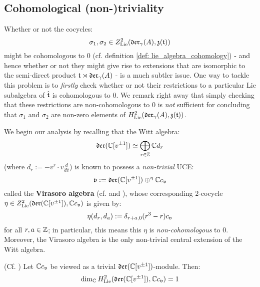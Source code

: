     \subsection{Cohomological (non-)triviality}
        Whether or not the cocycles:
            $$\sigma_1, \sigma_2 \in Z^2_{\mathrm{Lie}}(\mathfrak{der}_{\gamma}(A), \mathfrak{z}(\mathfrak{t}))$$
        might be cohomologous to $0$ (cf. definition \ref{def: lie_algebra_cohomology}) - and hence whether or not they might give rise to extensions that are isomorphic to the semi-direct product $\mathfrak{t} \rtimes \mathfrak{der}_{\gamma}(A)$ - is a much subtler issue. One way to tackle this problem is to \textit{firstly} check whether or not their restrictions to a particular Lie subalgebra of $\hat{\mathfrak{t}}$ is cohomologous to $0$. We remark right away that simply checking that these restrictions are non-cohomologous to $0$ is \textit{not} sufficient for concluding that $\sigma_1$ and $\sigma_2$ are non-zero elements of $H^2_{\mathrm{Lie}}(\mathfrak{der}_{\gamma}(A), \mathfrak{z}(\mathfrak{t}))$.

        We begin our analysis by recalling that the Witt algebra:
            $$\mathfrak{der}(\mathbb{C}[v^{\pm 1}]) \simeq \bigoplus_{r \in \mathbb{Z}} \mathbb{C} d_r$$
        (where $d_r := -v^r \cdot v\frac{d}{dv}$) is known to possess a \textit{non-trivial} UCE:
            $$\mathfrak{v} := \mathfrak{der}(\mathbb{C}[v^{\pm 1}]) \oplus^{\eta} \mathbb{C} c_{\mathfrak{v}}$$
        called the \textbf{Virasoro algebra} (cf. \cite[Sections 9.13 and 9.14]{kac_infinite_dimensional_lie_algebras} and \cite[Section 1.3]{kac_raina_rozhkovskaya_bombay_lectures_on_highest_weight_modules_of_infinite_dimensional_lie_algebras}), whose corresponding $2$-cocycle $\eta \in Z^2_{\mathrm{Lie}}( \mathfrak{der}(\mathbb{C}[v^{\pm 1}]), \mathbb{C} c_{\mathfrak{v}} )$ is given by:
            $$\eta(d_r, d_a) := \delta_{r + a, 0} (r^3 - r) c_{\mathfrak{v}}$$
        for all $r, a \in \mathbb{Z}$; in particular, this means this $\eta$ is \textit{non-cohomologous} to $0$. Moreover, the Virasoro algebra is the only non-trivial central extension of the Witt algebra.
        \begin{lemma} \label{lemma: H^2_of_witt_algebra}
            (Cf. \cite[Proposition 1.3]{kac_raina_rozhkovskaya_bombay_lectures_on_highest_weight_modules_of_infinite_dimensional_lie_algebras}) Let $\mathbb{C} c_{\mathfrak{v}}$ be viewed as a trivial $\mathfrak{der}(\mathbb{C}[v^{\pm 1}])$-module. Then:
                $$\dim_{\mathbb{C}} H^2_{\mathrm{Lie}}( \mathfrak{der}(\mathbb{C}[v^{\pm 1}]), \mathbb{C} c_{\mathfrak{v}} ) = 1$$
        \end{lemma}

